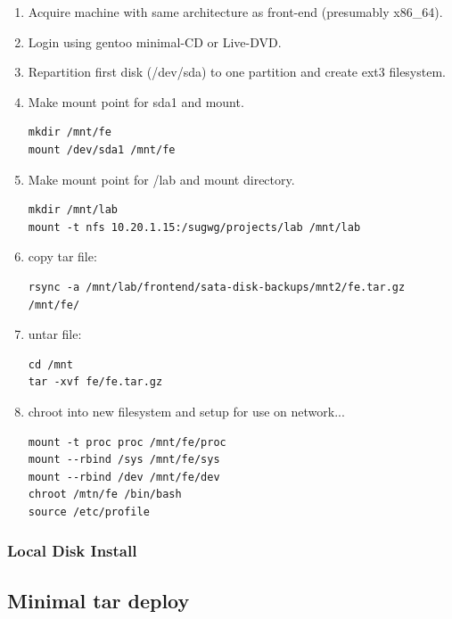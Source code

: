 \begin{enumerate}
    \item Acquire machine with same architecture as front-end (presumably x86\_64).
    \item Login using gentoo minimal-CD or Live-DVD.
    \item Repartition first disk (/dev/sda) to one partition and create ext3 filesystem.
    \item Make mount point for sda1 and mount.
%
\begin{lstlisting}
mkdir /mnt/fe
mount /dev/sda1 /mnt/fe
\end{lstlisting}
%
    \item Make mount point for /lab and mount directory.

\begin{lstlisting}
mkdir /mnt/lab
mount -t nfs 10.20.1.15:/sugwg/projects/lab /mnt/lab
\end{lstlisting}

    \item copy tar file:

\begin{lstlisting}
rsync -a /mnt/lab/frontend/sata-disk-backups/mnt2/fe.tar.gz /mnt/fe/
\end{lstlisting}

    \item untar file:

\begin{lstlisting}
cd /mnt
tar -xvf fe/fe.tar.gz
\end{lstlisting}

    \item chroot into new filesystem and setup for use on network...

\begin{lstlisting}
mount -t proc proc /mnt/fe/proc
mount --rbind /sys /mnt/fe/sys
mount --rbind /dev /mnt/fe/dev
chroot /mtn/fe /bin/bash
source /etc/profile
\end{lstlisting}
\end{enumerate}


\subsubsection{Local Disk Install}

\subsection{Minimal tar deploy}


